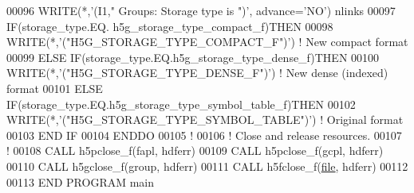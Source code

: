 \begin{DoxyCode}
00096      \textcolor{keyword}{WRITE}(*,\textcolor{stringliteral}{'(I1," Groups: Storage type is ")'}, advance=\textcolor{stringliteral}{'NO'}) nlinks
00097      \textcolor{keywordflow}{IF}(storage\_type.EQ. h5g\_storage\_type\_compact\_f)\textcolor{keywordflow}{THEN}
00098         \textcolor{keyword}{WRITE}(*,\textcolor{stringliteral}{'("H5G\_STORAGE\_TYPE\_COMPACT\_F")'})  \textcolor{comment}{! New compact format}
00099      \textcolor{keywordflow}{ELSE} \textcolor{keywordflow}{IF}(storage\_type.EQ.h5g\_storage\_type\_dense\_f)\textcolor{keywordflow}{THEN}
00100         \textcolor{keyword}{WRITE}(*,\textcolor{stringliteral}{'("H5G\_STORAGE\_TYPE\_DENSE\_F")'}) \textcolor{comment}{! New dense (indexed) format}
00101      \textcolor{keywordflow}{ELSE} \textcolor{keywordflow}{IF}(storage\_type.EQ.h5g\_storage\_type\_symbol\_table\_f)\textcolor{keywordflow}{THEN}
00102         \textcolor{keyword}{WRITE}(*,\textcolor{stringliteral}{'("H5G\_STORAGE\_TYPE\_SYMBOL\_TABLE")'}) \textcolor{comment}{! Original format}
00103 \textcolor{keywordflow}{     END IF}
00104 \textcolor{keywordflow}{  ENDDO}
00105   \textcolor{comment}{!}
00106   \textcolor{comment}{! Close and release resources.}
00107   \textcolor{comment}{!}
00108   \textcolor{keyword}{CALL }h5pclose\_f(fapl, hdferr)
00109   \textcolor{keyword}{CALL }h5pclose\_f(gcpl, hdferr)
00110   \textcolor{keyword}{CALL }h5gclose\_f(group, hdferr)
00111   \textcolor{keyword}{CALL }h5fclose\_f(\hyperlink{structfile}{file}, hdferr)
00112 
00113 \textcolor{keyword}{END PROGRAM }main
\end{DoxyCode}
